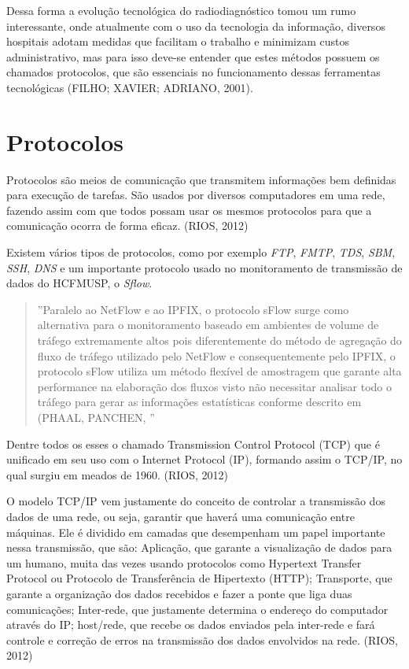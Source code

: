 \documentclass[
	12pt,				%
	openright,			%
	twoside,			%
	a4paper,			%
	english,			%
	french,				%
	spanish,			%
	brazil				%
	]{abntex2}
\begin{document}
Dessa forma a evolução tecnológica do radiodiagnóstico tomou um rumo interessante, onde atualmente com o uso da tecnologia da informação, diversos hospitais adotam medidas que facilitam o trabalho e minimizam custos administrativo, mas para isso deve-se entender que estes métodos possuem os chamados protocolos, que são essenciais no funcionamento dessas ferramentas tecnológicas (FILHO; XAVIER; ADRIANO, 2001).

\section{Protocolos}
Protocolos são meios de comunicação que transmitem informações bem definidas para execução de tarefas. São usados por diversos computadores em uma rede, fazendo assim com que todos possam usar os mesmos protocolos para que a comunicação ocorra de forma eficaz. (RIOS, 2012)

Existem vários tipos de protocolos, como por exemplo \emph{FTP}, \emph{FMTP}, \emph{TDS}, \emph{SBM}, \emph{SSH}, \emph{DNS} e um importante protocolo usado no monitoramento de transmissão de dados do HCFMUSP, o \emph{Sflow}.

\begin{quote}
''Paralelo ao NetFlow e ao IPFIX, o protocolo sFlow surge como alternativa para o monitoramento baseado em ambientes de volume de tráfego extremamente altos pois diferentemente do método de agregação do fluxo de tráfego utilizado pelo NetFlow e consequentemente pelo IPFIX, o protocolo sFlow utiliza um método flexível de amostragem que garante alta performance na elaboração dos fluxos visto não necessitar analisar todo o tráfego para gerar as informações estatísticas conforme descrito em (PHAAL, PANCHEN, %
''
\end{quote}

Dentre todos os esses o chamado Transmission Control Protocol (TCP) que é unificado em seu uso com o Internet Protocol (IP), formando assim o TCP/IP, no qual surgiu em meados de 1960. (RIOS, 2012)

O modelo TCP/IP vem justamente do conceito de controlar a transmissão dos dados de uma rede, ou seja, garantir que haverá uma comunicação entre máquinas. Ele é dividido em camadas que desempenham um papel importante nessa transmissão, que são: Aplicação, que garante a visualização de dados para um humano, muita das vezes usando protocolos como Hypertext Transfer Protocol ou Protocolo de Transferência de Hipertexto (HTTP); Transporte, que garante a organização dos dados recebidos e fazer a ponte que liga duas comunicações; Inter-rede, que justamente determina o endereço do computador através do IP; host/rede, que recebe os dados enviados pela inter-rede e fará controle e correção de erros na transmissão dos dados envolvidos na rede. (RIOS, 2012)
\end{document}
